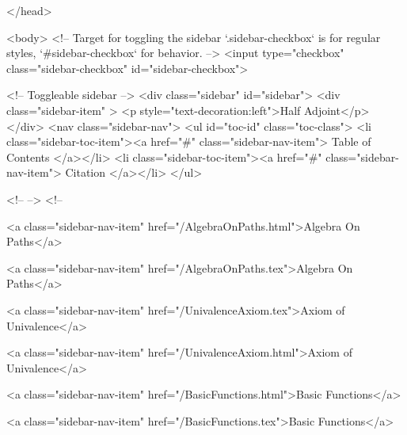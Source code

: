   
</head>




  <body>
    <!-- Target for toggling the sidebar `.sidebar-checkbox` is for regular
     styles, `#sidebar-checkbox` for behavior. -->
<input type="checkbox" class="sidebar-checkbox" id="sidebar-checkbox">

<!-- Toggleable sidebar -->
<div class="sidebar" id="sidebar">
  <div class="sidebar-item" >
    <p style="text-decoration:left">Half Adjoint</p>
  </div>
  <nav class="sidebar-nav">
    <ul id="toc-id" class="toc-class">
  <li class="sidebar-toc-item"><a href="#" class="sidebar-nav-item"> Table of Contents </a></li>
  <li class="sidebar-toc-item"><a href="#" class="sidebar-nav-item"> Citation </a></li>
</ul>


    <!--  -->
    <!-- 
      
    
      
    
      
    
      
        
      
    
      
        
          <a class="sidebar-nav-item" href="/AlgebraOnPaths.html">Algebra On Paths</a>
        
      
    
      
        
          <a class="sidebar-nav-item" href="/AlgebraOnPaths.tex">Algebra On Paths</a>
        
      
    
      
        
          <a class="sidebar-nav-item" href="/UnivalenceAxiom.tex">Axiom of Univalence</a>
        
      
    
      
        
          <a class="sidebar-nav-item" href="/UnivalenceAxiom.html">Axiom of Univalence</a>
        
      
    
      
        
          <a class="sidebar-nav-item" href="/BasicFunctions.html">Basic Functions</a>
        
      
    
      
        
          <a class="sidebar-nav-item" href="/BasicFunctions.tex">Basic Functions</a>
        
      
    
      
        
